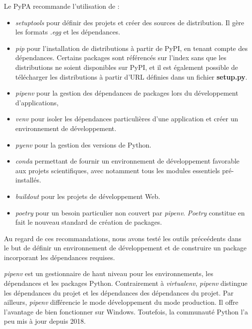 \documentclass[twoside,a4paper,11pt,frenchb,openany]{report}
\begin{document}
	Le PyPA recommande l'utilisation de :
\begin{itemize}
\item \textit{setuptools} pour définir des projets et créer des sources de distribution. Il gère les formats \textit{.egg} et les dépendances.
\item \textit{pip} pour l'installation de distributions à partir de PyPI, en tenant compte des dépendances. Certains packages sont référencés sur l'index sans que les distributions ne soient disponibles sur PyPI, et il est également possible de télécharger les distributions à partir d'URL définies dans un fichier \textbf{setup.py}.
\item \textit{pipenv} pour la gestion des dépendances de packages lors du développement d'applications,
\item \textit{venv} pour isoler les dépendances particulières d'une application et créer un environnement de développement.
\item \textit{pyenv} pour la gestion des versions de Python.
\item \textit{conda} permettant de fournir un environnement de développement favorable aux projets scientifiques, avec notamment tous les modules essentiels pré-installés.
\item \textit{buildout} pour les projets de développement Web.
\item \textit{poetry} pour un besoin particulier non couvert par \textit{pipenv}. \textit{Poetry} constitue en fait le nouveau standard de création de packages.
\end{itemize}

Au regard de ces recommandations, nous avons testé les outils préceédents dans le but de définir un environnement de développement et de construire un package incorporant les dépendances requises.

\textit{pipenv} est un gestionnaire de haut niveau pour les environnements, les dépendances et les packages Python. Contrairement à \textit{virtualenv}, \textit{pipenv} distingue les dépendances du projet et les dépendances des dépendances du projet. Par ailleurs, \textit{pipenv} différencie le mode développement du mode production. Il offre l'avantage de bien fonctionner sur Windows. Toutefois, la communauté Python l'a peu mis à jour depuis 2018.
\end{document}
